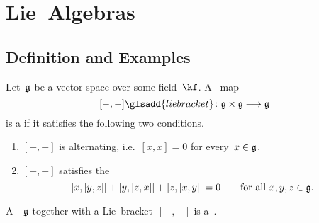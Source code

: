 \chapter{Lie~Algebras}














\section{Definition and Examples}


\begin{definition}
  Let~$\mathfrak{g}$ be a vector space over some field~$\kf$.
  A~{\bilinear{$\kf$}} map
  \[
    [-,-]\glsadd{lie bracket}
    \colon
    \glie \times \glie
    \to
    \glie
  \]
  is a  if it satisfies the following two conditions.
  \begin{enumerate}
    \item
    $[-, -]$ is alternating, i.e.~$[x,x] = 0$ for every~$x \in \mathfrak{g}$.
    \item
    $[-, -]$ satisfies the 
    \[
      [x,[y,z]] + [y,[z,x]] + [z,[x,y]]
      =
      0
      \qquad
      \text{for all~$x, y, z \in \mathfrak{g}$.}
    \]
  \end{enumerate}
  A~{\vectorspace{$\kf$}}~$\mathfrak{g}$ together with a Lie~bracket~$[-,-]$ is a~.
\end{definition}


